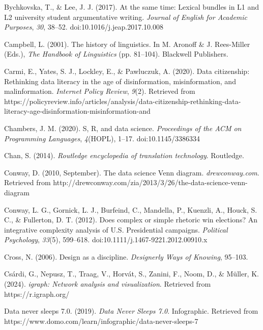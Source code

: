 \documentclass[
  letterpaper,
  krantz1]{latex/krantz-mod}
\newlength{\cslhangindent}
\newenvironment{CSLReferences}[2] %
 {\begin{list}{}{%
  \setlength{\itemindent}{0pt}
  \setlength{\leftmargin}{0pt}
  \setlength{\parsep}{0pt}
  \ifodd #1
   \setlength{\leftmargin}{\cslhangindent}
   \setlength{\itemindent}{-1\cslhangindent}
  \fi
  \setlength{\itemsep}{#2\baselineskip}}}
 {\end{list}}
\theoremstyle{definition}
\theoremstyle{definition}
\theoremstyle{remark}
\begin{document}
\begin{CSLReferences}{1}{0}
Bychkovska, T., \& Lee, J. J. (2017). At the same time: {Lexical}
bundles in {L1} and {L2} university student argumentative writing.
\emph{Journal of English for Academic Purposes}, \emph{30}, 38--52.
doi:10.1016/j.jeap.2017.10.008

Campbell, L. (2001). The history of linguistics. In M. Aronoff \& J.
Rees-Miller (Eds.), \emph{The {Handbook} of {Linguistics}} (pp.
81--104). Blackwell Publishers.

Carmi, E., Yates, S. J., Lockley, E., \& Pawluczuk, A. (2020). Data
citizenship: Rethinking data literacy in the age of disinformation,
misinformation, and malinformation. \emph{Internet Policy Review},
\emph{9}(2). Retrieved from
https://policyreview.info/articles/analysis/data-citizenship-rethinking-data-literacy-age-disinformation-misinformation-and

Chambers, J. M. (2020). S, {R}, and data science. \emph{Proceedings of
the ACM on Programming Languages}, \emph{4}(HOPL), 1--17.
doi:10.1145/3386334

Chan, S. (2014). \emph{Routledge encyclopedia of translation
technology}. Routledge.

Conway, D. (2010, September). The data science {Venn} diagram.
\emph{drewconway.com}. Retrieved from
http://drewconway.com/zia/2013/3/26/the-data-science-venn-diagram

Conway, L. G., Gornick, L. J., Burfeind, C., Mandella, P., Kuenzli, A.,
Houck, S. C., \& Fullerton, D. T. (2012). Does complex or simple
rhetoric win elections? {An} integrative complexity analysis of {U}.{S}.
Presidential campaigns. \emph{Political Psychology}, \emph{33}(5),
599--618. doi:10.1111/j.1467-9221.2012.00910.x

Cross, N. (2006). Design as a discipline. \emph{Designerly Ways of
Knowing}, 95--103.

Csárdi, G., Nepusz, T., Traag, V., Horvát, S., Zanini, F., Noom, D., \&
Müller, K. (2024). \emph{{igraph}: Network analysis and visualization}.
Retrieved from https://r.igraph.org/

Data never sleeps 7.0. (2019). \emph{Data Never Sleeps 7.0}.
Infographic. Retrieved from
https://www.domo.com/learn/infographic/data-never-sleeps-7


\end{CSLReferences}
\end{document}
